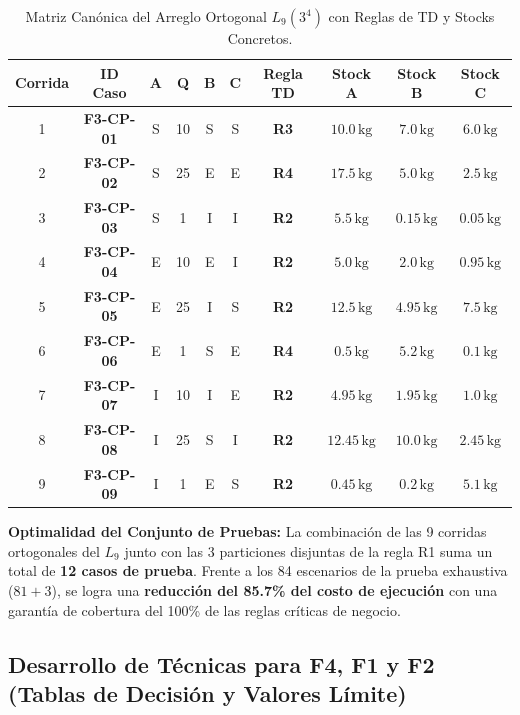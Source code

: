 \documentclass[11pt,a4paper]{article}
\begin{document}
\begin{table}[htbp]
\centering
\small
\begin{tabularx}{\textwidth}{c c c c c c c c c c}
\toprule
\textbf{Corrida} & \textbf{ID Caso} & \textbf{A} & \textbf{Q} & \textbf{B} & \textbf{C} & \textbf{Regla TD} & \textbf{Stock A} & \textbf{Stock B} & \textbf{Stock C} \\
\midrule
1 & \textbf{F3-CP-01} & S & 10 & S & S & \textbf{R3} & $10.0\,\text{kg}$ & $7.0\,\text{kg}$ & $6.0\,\text{kg}$ \\
2 & \textbf{F3-CP-02} & S & 25 & E & E & \textbf{R4} & $17.5\,\text{kg}$ & $5.0\,\text{kg}$ & $2.5\,\text{kg}$ \\
3 & \textbf{F3-CP-03} & S & 1 & I & I & \textbf{R2} & $5.5\,\text{kg}$ & $0.15\,\text{kg}$ & $0.05\,\text{kg}$ \\
4 & \textbf{F3-CP-04} & E & 10 & E & I & \textbf{R2} & $5.0\,\text{kg}$ & $2.0\,\text{kg}$ & $0.95\,\text{kg}$ \\
5 & \textbf{F3-CP-05} & E & 25 & I & S & \textbf{R2} & $12.5\,\text{kg}$ & $4.95\,\text{kg}$ & $7.5\,\text{kg}$ \\
6 & \textbf{F3-CP-06} & E & 1 & S & E & \textbf{R4} & $0.5\,\text{kg}$ & $5.2\,\text{kg}$ & $0.1\,\text{kg}$ \\
7 & \textbf{F3-CP-07} & I & 10 & I & E & \textbf{R2} & $4.95\,\text{kg}$ & $1.95\,\text{kg}$ & $1.0\,\text{kg}$ \\
8 & \textbf{F3-CP-08} & I & 25 & S & I & \textbf{R2} & $12.45\,\text{kg}$ & $10.0\,\text{kg}$ & $2.45\,\text{kg}$ \\
9 & \textbf{F3-CP-09} & I & 1 & E & S & \textbf{R2} & $0.45\,\text{kg}$ & $0.2\,\text{kg}$ & $5.1\,\text{kg}$ \\
\bottomrule
\end{tabularx}
\caption{Matriz Canónica del Arreglo Ortogonal $L_9(3^4)$ con Reglas de TD y Stocks Concretos.}\label{tab:matriz_l9}
\end{table}

\textbf{Optimalidad del Conjunto de Pruebas:} La combinación de las 9 corridas ortogonales del $L_9$ junto con las 3 particiones disjuntas de la regla R1 suma un total de \textbf{12 casos de prueba}. Frente a los 84 escenarios de la prueba exhaustiva ($81 + 3$), se logra una \textbf{reducción del 85.7\% del costo de ejecución} con una garantía de cobertura del 100\% de las reglas críticas de negocio.

\subsection{Desarrollo de Técnicas para F4, F1 y F2 (Tablas de Decisión y Valores Límite)}
\end{document}
